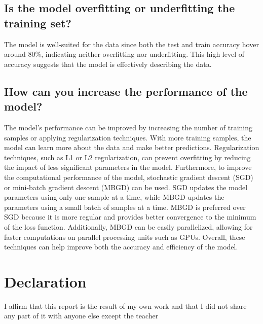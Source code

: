 \documentclass{article}
\begin{document}
\subsection{Is the model overfitting or underfitting the training set?}
The model is well-suited for the data since both the test and train accuracy hover around 80\%,
indicating neither overfitting nor underfitting.
This high level of accuracy suggests that the model is effectively describing the data.


\subsection{How can you increase the performance of the model?}
The model's performance can be improved by increasing the number of training samples or applying regularization techniques.
With more training samples, the model can learn more about the data and make better predictions.
Regularization techniques, such as L1 or L2 regularization,
can prevent overfitting by reducing the impact of less significant parameters in the model.
Furthermore, to improve the computational performance of the model,
stochastic gradient descent (SGD) or mini-batch gradient descent (MBGD) can be used.
SGD updates the model parameters using only one sample at a time, while MBGD updates the parameters using a small batch of samples at a time.
MBGD is preferred over SGD because it is more regular and provides better convergence to the minimum of the loss function.
Additionally, MBGD can be easily parallelized, allowing for faster computations on parallel processing units such as GPUs.
Overall, these techniques can help improve both the accuracy and efficiency of the model.

\section{Declaration}
I affirm that
this report is the result of my own work and that I did not share any part of it with
anyone else except the teacher
\end{document}
